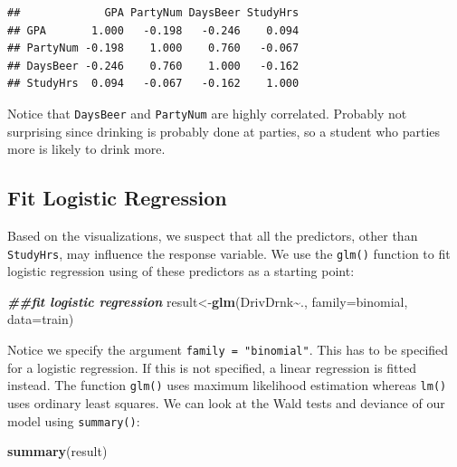 \documentclass[
]{book}
\newenvironment{Shaded}{\begin{snugshade}}{\end{snugshade}}
\newcommand{\AttributeTok}[1]{\textcolor[rgb]{0.13,0.29,0.53}{#1}}
\newcommand{\DocumentationTok}[1]{\textcolor[rgb]{0.56,0.35,0.01}{\textbf{\textit{#1}}}}
\newcommand{\FunctionTok}[1]{\textcolor[rgb]{0.13,0.29,0.53}{\textbf{#1}}}
\newcommand{\NormalTok}[1]{#1}
\newcommand{\OtherTok}[1]{\textcolor[rgb]{0.56,0.35,0.01}{#1}}
\newcommand{\SpecialCharTok}[1]{\textcolor[rgb]{0.81,0.36,0.00}{\textbf{#1}}}
\begin{document}
\begin{verbatim}
##             GPA PartyNum DaysBeer StudyHrs
## GPA       1.000   -0.198   -0.246    0.094
## PartyNum -0.198    1.000    0.760   -0.067
## DaysBeer -0.246    0.760    1.000   -0.162
## StudyHrs  0.094   -0.067   -0.162    1.000
\end{verbatim}

Notice that \texttt{DaysBeer} and \texttt{PartyNum} are highly correlated. Probably not surprising since drinking is probably done at parties, so a student who parties more is likely to drink more.

\hypertarget{fit-logistic-regression}{%
\subsection*{Fit Logistic Regression}\label{fit-logistic-regression}}

Based on the visualizations, we suspect that all the predictors, other than \texttt{StudyHrs}, may influence the response variable. We use the \texttt{glm()} function to fit logistic regression using of these predictors as a starting point:

\begin{Shaded}
\begin{Highlighting}[]
\DocumentationTok{\#\#fit logistic regression}
\NormalTok{result}\OtherTok{\textless{}{-}}\FunctionTok{glm}\NormalTok{(DrivDrnk}\SpecialCharTok{\textasciitilde{}}\NormalTok{., }\AttributeTok{family=}\NormalTok{binomial, }\AttributeTok{data=}\NormalTok{train)}
\end{Highlighting}
\end{Shaded}

Notice we specify the argument \texttt{family\ =\ "binomial"}. This has to be specified for a logistic regression. If this is not specified, a linear regression is fitted instead. The function \verb=glm()= uses maximum likelihood estimation whereas \verb=lm()= uses ordinary least squares. We can look at the Wald tests and deviance of our model using \texttt{summary()}:

\begin{Shaded}
\begin{Highlighting}[]
\FunctionTok{summary}\NormalTok{(result)}
\end{Highlighting}
\end{Shaded}
\end{document}
